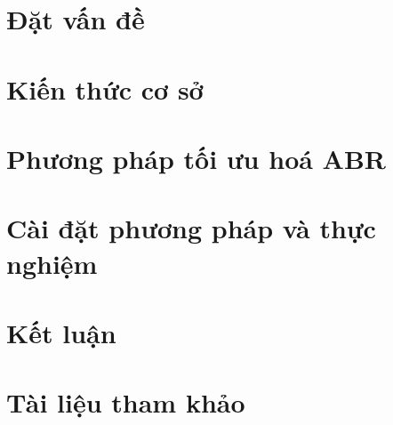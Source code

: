 \documentclass[12pt]{report}
\begin{document}
\chapter{Đặt vấn đề}
% 

\chapter{Kiến thức cơ sở}
% 

\chapter{Phương pháp tối ưu hoá ABR}
% 

\chapter{Cài đặt phương pháp và thực nghiệm}
% 

\chapter{Kết luận}
% 

\chapter*{Tài liệu tham khảo}
% 

\end{document}
